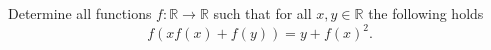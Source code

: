 Determine all functions $f\colon\mathbb{R} \rightarrow \mathbb{R}$ such
that for all $x,y \in \mathbb{R}$ the following holds
$$f(xf(x)+f(y))=y+f(x)^2.$$
